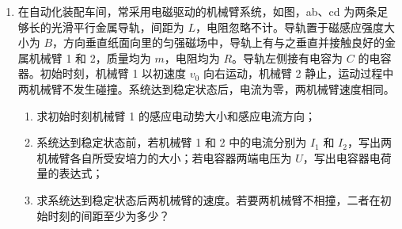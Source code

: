 \documentclass[\gkver]{gaokaozhenti}
\begin{document}
\begin{enumerate}
{在垂直杆方向，当 $F\sin \theta = mg\cos \theta$ 时，$t = 4 \Us$

则 $0 \sim 4 \Us$，垂直杆方向 $F\sin \theta + N = mg\cos \theta$

摩擦力 $f = \mu N = \frac{\sqrt{3}}{3}\left( \frac{3}{2}mg - \frac{3}{8}mgt \right) = \left( \frac{1}{2} - \frac{1}{8}t \right)mg$（$0 \leq t \leq 4$）

在 $4 \sim 6 \Us$ 内，垂直杆方向 $F\sin \theta = mg\cos \theta + N$

摩擦力 $f = \mu N = \frac{\sqrt{3}}{3}\left( \frac{3}{8}mgt - \frac{3}{2}mg \right) = \left( \frac{1}{8}t - \frac{1}{2} \right)mg$（$4 \leq t \leq 6$）

相应的 $f-t$ 图像如图


（3）在 $0 \sim 6 \Us$ 内沿杆方向根据动量定理有 $I_{F}\cos \theta - I_{f} + mg\sin \theta \times t = mv$

在 $0 \sim 6 \Us$ 内摩擦力的冲量为 $f-t$ 图围成的面积，则 $I_{f} = \frac{1}{2} \times \frac{1}{2}mg \times 4 + \frac{1}{2} \times \frac{1}{4}mg \times 2 = \frac{5}{4}mg$

联立有 $\frac{9\sqrt{3}}{2}mg \cdot \cos 30\Udu + 3mg - \frac{5}{4}mg = mv$

可得 $v = \frac{17}{2}g$
}

\item
在自动化装配车间，常采用电磁驱动的机械臂系统，如图，ab、cd 为两条足够长的光滑平行金属导轨，间距为 $L$，电阻忽略不计。导轨置于磁感应强度大小为 $B$，方向垂直纸面向里的匀强磁场中，导轨上有与之垂直并接触良好的金属机械臂 1 和 2，质量均为 $m$，电阻均为 $R$。导轨左侧接有电容为 $C$ 的电容器。初始时刻，机械臂 1 以初速度 $v_{0}$ 向右运动，机械臂 2 静止，运动过程中两机械臂不发生碰撞。系统达到稳定状态后，电流为零，两机械臂速度相同。

\begin{enumerate}
\item
求初始时刻机械臂 1 的感应电动势大小和感应电流方向；
\item
系统达到稳定状态前，若机械臂 1 和 2 中的电流分别为 $I_{1}$ 和 $I_{2}$，写出两机械臂各自所受安培力的大小；若电容器两端电压为 $U$，写出电容器电荷量的表达式；
\item
求系统达到稳定状态后两机械臂的速度。若要两机械臂不相撞，二者在初始时刻的间距至少为多少？
\end{enumerate}


\end{enumerate}
\end{document}
